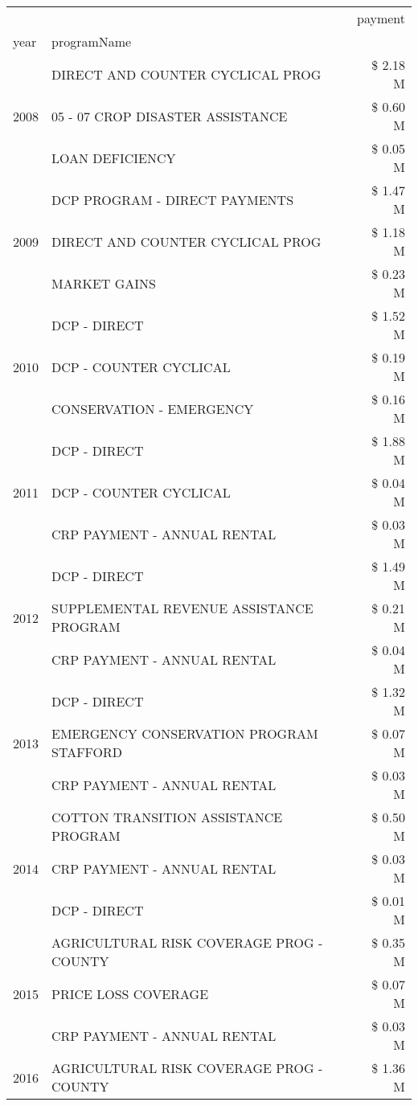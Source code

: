 \begin{tabular}{llr}
\toprule
 &  & payment \\
year & programName &  \\
\midrule
\multirow[t]{3}{*}{2008} & DIRECT AND COUNTER CYCLICAL PROG & \$ 2.18 M \\
 & 05 - 07 CROP DISASTER ASSISTANCE & \$ 0.60 M \\
 & LOAN DEFICIENCY & \$ 0.05 M \\
\cline{1-3}
\multirow[t]{3}{*}{2009} & DCP PROGRAM - DIRECT PAYMENTS & \$ 1.47 M \\
 & DIRECT AND COUNTER CYCLICAL PROG & \$ 1.18 M \\
 & MARKET GAINS & \$ 0.23 M \\
\cline{1-3}
\multirow[t]{3}{*}{2010} & DCP - DIRECT & \$ 1.52 M \\
 & DCP - COUNTER CYCLICAL & \$ 0.19 M \\
 & CONSERVATION - EMERGENCY & \$ 0.16 M \\
\cline{1-3}
\multirow[t]{3}{*}{2011} & DCP - DIRECT & \$ 1.88 M \\
 & DCP - COUNTER CYCLICAL & \$ 0.04 M \\
 & CRP PAYMENT - ANNUAL RENTAL & \$ 0.03 M \\
\cline{1-3}
\multirow[t]{3}{*}{2012} & DCP - DIRECT & \$ 1.49 M \\
 & SUPPLEMENTAL REVENUE ASSISTANCE PROGRAM & \$ 0.21 M \\
 & CRP PAYMENT - ANNUAL RENTAL & \$ 0.04 M \\
\cline{1-3}
\multirow[t]{3}{*}{2013} & DCP - DIRECT & \$ 1.32 M \\
 & EMERGENCY CONSERVATION PROGRAM STAFFORD & \$ 0.07 M \\
 & CRP PAYMENT - ANNUAL RENTAL & \$ 0.03 M \\
\cline{1-3}
\multirow[t]{3}{*}{2014} & COTTON TRANSITION ASSISTANCE PROGRAM & \$ 0.50 M \\
 & CRP PAYMENT - ANNUAL RENTAL & \$ 0.03 M \\
 & DCP - DIRECT & \$ 0.01 M \\
\cline{1-3}
\multirow[t]{3}{*}{2015} & AGRICULTURAL RISK COVERAGE PROG - COUNTY & \$ 0.35 M \\
 & PRICE LOSS COVERAGE & \$ 0.07 M \\
 & CRP PAYMENT - ANNUAL RENTAL & \$ 0.03 M \\
\cline{1-3}
\multirow[t]{3}{*}{2016} & AGRICULTURAL RISK COVERAGE PROG - COUNTY & \$ 1.36 M \\

\end{tabular}
